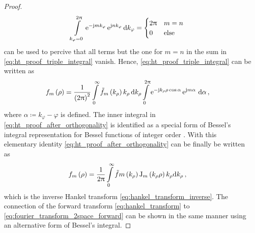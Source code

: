 \begin{proof}
	\begin{equation}
		\int\limits_{k_\varphi = 0}^{2\uppi} 
		\mathrm{e}^{-\mathrm{j} m k_\varphi}\,
		\mathrm{e}^{\mathrm{j} n k_\varphi}\,
		\mathrm{d} k_\varphi 
		=
		\begin{cases}
			2\uppi & m = n\\
			0    & \mathrm{else}
		\end{cases}
	\end{equation}
	can be used to percive that all terms but the one for $m = n$ in the sum in 
	\eqref{eq:ht_proof_triple_integral} vanish.
	Hence, \eqref{eq:ht_proof_triple_integral} can be written as
	\begin{equation}\label{eq:ht_proof_after_orthogonality}
		f_m \left(\rho\right) = 
		\frac{1}{\left(2\uppi\right)^2}
		\int\limits_{0}^{\infty} 
		\tilde{f}_m \left(k_\rho\right)
		k_\rho
		\,
		\mathrm{d} k_\rho
		\int\limits_{0}^{2\uppi}
		\mathrm{e}^{-\mathrm{j} k_\rho \rho \cos \alpha}\,
		\mathrm{e}^{\mathrm{j} m \alpha}\,
		\,
		\mathrm{d} \alpha 
		\, ,
	\end{equation}
	where $\alpha \coloneqq k_\varphi - \varphi$ is defined.
	The inner integral in \eqref{eq:ht_proof_after_orthogonality} is identified
	as a special form of Bessel's integral representation for Bessel functions
	of integer order
	\cite[223]{Olver2010}\cite[314]{Davies2002}\cite[222]{temme1996}\cite[163]{Jackson2013}.
	With this elementary identity \eqref{eq:ht_proof_after_orthogonality} can be
	finally be written as
	\begin{equation}
		f_m \left(\rho\right) =
		\frac{1}{2\uppi}
		\int\limits_{0}^{\infty}
		\tilde{f}m \left(k_\rho\right)
		\operatorname{J}_{m}\left(k_\rho \rho\right)
		k_\rho
		\mathrm{d} k_\rho 
		\, ,
	\end{equation}
	which is the inverse Hankel transform \eqref{eq:hankel_transform_inverse}.
	The connection of the forward transform \eqref{eq:hankel_transform}
	to \eqref{eq:fourier_transform_2space_forward} can be shown in the same
	manner using an alternative form of Bessel's integral.
\end{proof}

